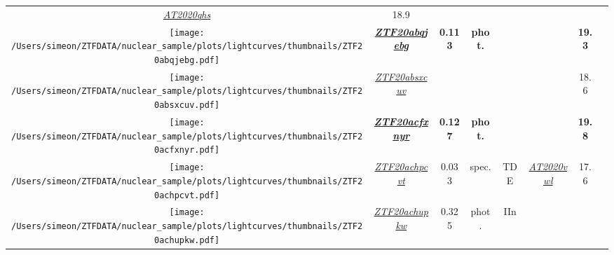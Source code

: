 \begin{table*}
{\begin{tabular}{c c  c  c  c   c  c  c}
      \textit{\href{https://www.wis-tns.org/object/2020qhs}{AT2020qhs}}                                                                           & 18.9                                                                                              &                                                                                                                                 \\
      \parbox[c]{12em}{\texttt{[image: /Users/simeon/ZTFDATA/nuclear\_sample/plots/lightcurves/thumbnails/ZTF20abqjebg.pdf]}} & \textbf{\textit{\href{https://ztfnuclear.simeonreusch.com/transient/ZTF20abqjebg}{ZTF20abqjebg}}} & \textbf{0.113} & \textbf{phot.}          & ~                 & ~                          & \textbf{19.3}  &                    \\
      \parbox[c]{12em}{\texttt{[image: /Users/simeon/ZTFDATA/nuclear\_sample/plots/lightcurves/thumbnails/ZTF20absxcuv.pdf]}} & \textit{\href{https://ztfnuclear.simeonreusch.com/transient/ZTF20absxcuv}{ZTF20absxcuv}}          & ~              & ~                       & ~                 & ~                          & 18.6           &                    \\
      \parbox[c]{12em}{\texttt{[image: /Users/simeon/ZTFDATA/nuclear\_sample/plots/lightcurves/thumbnails/ZTF20acfxnyr.pdf]}} & \textbf{\textit{\href{https://ztfnuclear.simeonreusch.com/transient/ZTF20acfxnyr}{ZTF20acfxnyr}}} & \textbf{0.127} & \textbf{phot.}          & ~                 & ~                          & \textbf{19.8}  &                    \\
      \parbox[c]{12em}{\texttt{[image: /Users/simeon/ZTFDATA/nuclear\_sample/plots/lightcurves/thumbnails/ZTF20achpcvt.pdf]}} & \textit{\href{https://ztfnuclear.simeonreusch.com/transient/ZTF20achpcvt}{ZTF20achpcvt}}          & 0.033          & spec.                   & TDE               &
      \textit{\href{https://www.wis-tns.org/object/2020vwl}{AT2020vwl}}                                                                           & 17.6                                                                                              &                                                                                                                                 \\
      \parbox[c]{12em}{\texttt{[image: /Users/simeon/ZTFDATA/nuclear\_sample/plots/lightcurves/thumbnails/ZTF20achupkw.pdf]}} & \textit{\href{https://ztfnuclear.simeonreusch.com/transient/ZTF20achupkw}{ZTF20achupkw}}          & 0.325          & phot.                   & IIn               &

\end{tabular}}
\end{table*}
